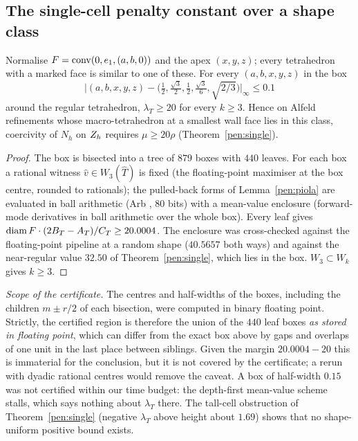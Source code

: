 \subsection{The single-cell penalty constant over a shape class}
\begin{proposition}\label{ct:pen}
Normalise $F=\operatorname{conv}(0,e_1,(a,b,0))$ and the apex $(x,y,z)$; every tetrahedron with a marked face is similar to one of these. For every $(a,b,x,y,z)$ in the box
\[
\bigl|(a,b,x,y,z)-\bigl(\tfrac12,\tfrac{\sqrt3}2,\tfrac12,\tfrac{\sqrt3}6,\sqrt{2/3}\bigr)\bigr|_\infty\le0.1
\]
around the regular tetrahedron, $\lambda_T\ge20$ for every $k\ge3$. Hence on Alfeld refinements whose macro-tetrahedron at a smallest wall face lies in this class, coercivity of $N_h$ on $Z_h$ requires $\mu\ge20\rho$ (Theorem~\ref{pen:single}). 
\end{proposition}
\begin{proof}
The box is bisected into a tree of $879$ boxes with $440$ leaves. For each box a rational witness $\hat v\in W_3(\hat T)$ is fixed (the floating-point maximiser at the box centre, rounded to rationals); the pulled-back forms of Lemma~\ref{pen:piola} are evaluated in ball arithmetic (Arb \cite{Johansson2017}, $80$ bits) with a mean-value enclosure (forward-mode derivatives in ball arithmetic over the whole box). Every leaf gives $\operatorname{diam} F\cdot(2B_T-A_T)/C_T\ge20.0004$. The enclosure was cross-checked against the floating-point pipeline at a random shape ($40.5657$ both ways) and against the near-regular value $32.50$ of Theorem~\ref{pen:single}, which lies in the box. $W_3\subset W_k$ gives $k\ge3$.
\end{proof}
\emph{Scope of the certificate.} The centres and half-widths of the boxes, including the children $m\pm r/2$ of each bisection, were computed in binary floating point. Strictly, the certified region is therefore the union of the $440$ leaf boxes \emph{as stored in floating point}, which can differ from the exact box above by gaps and overlaps of one unit in the last place between siblings. Given the margin $20.0004-20$ this is immaterial for the conclusion, but it is not covered by the certificate; a rerun with dyadic rational centres would remove the caveat. A box of half-width $0.15$ was not certified within our time budget: the depth-first mean-value scheme stalls, which says nothing about $\lambda_T$ there. The tall-cell obstruction of Theorem~\ref{pen:single} (negative $\lambda_T$ above height about $1.69$) shows that no shape-uniform positive bound exists.

